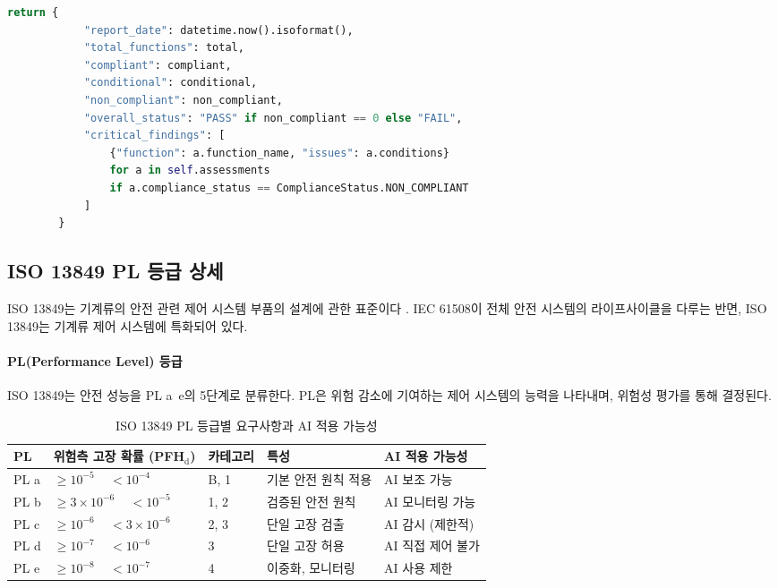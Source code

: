 \begin{lstlisting}[language=Python, caption={IEC 61508 AI Application Guide: SIL Compliance Assessment Framework}, label={lst:iec61508_guide}]
        return {
            "report_date": datetime.now().isoformat(),
            "total_functions": total,
            "compliant": compliant,
            "conditional": conditional,
            "non_compliant": non_compliant,
            "overall_status": "PASS" if non_compliant == 0 else "FAIL",
            "critical_findings": [
                {"function": a.function_name, "issues": a.conditions}
                for a in self.assessments
                if a.compliance_status == ComplianceStatus.NON_COMPLIANT
            ]
        }
\end{lstlisting}

\subsection{ISO 13849 PL 등급 상세}
\label{sec:19.2.2}

ISO 13849는 기계류의 안전 관련 제어 시스템 부품의 설계에 관한 표준이다 \cite{iso13849}. IEC 61508이 전체 안전 시스템의 라이프사이클을 다루는 반면, ISO 13849는 기계류 제어 시스템에 특화되어 있다.

\paragraph{PL(Performance Level) 등급}

ISO 13849는 안전 성능을 PL a~e의 5단계로 분류한다. PL은 위험 감소에 기여하는 제어 시스템의 능력을 나타내며, 위험성 평가를 통해 결정된다.

\begin{table}[htbp]
\centering
\caption{ISO 13849 PL 등급별 요구사항과 AI 적용 가능성}
\label{tab:19_pl}
\begin{tabularx}{\textwidth}{p{1cm}p{2.5cm}p{2cm}Xp{2.5cm}}
\toprule
\textbf{PL} & \textbf{위험측 고장 확률 (PFH$_\text{d}$)} & \textbf{카테고리} & \textbf{특성} & \textbf{AI 적용 가능성} \\
\midrule
PL a & $\geq 10^{-5}$ ~ $<10^{-4}$ & B, 1 & 기본 안전 원칙 적용 & AI 보조 가능 \\
PL b & $\geq 3 \times 10^{-6}$ ~ $<10^{-5}$ & 1, 2 & 검증된 안전 원칙 & AI 모니터링 가능 \\
PL c & $\geq 10^{-6}$ ~ $<3 \times 10^{-6}$ & 2, 3 & 단일 고장 검출 & AI 감시 (제한적) \\
PL d & $\geq 10^{-7}$ ~ $<10^{-6}$ & 3 & 단일 고장 허용 & AI 직접 제어 불가 \\
PL e & $\geq 10^{-8}$ ~ $<10^{-7}$ & 4 & 이중화, 모니터링 & AI 사용 제한 \\
\bottomrule
\end{tabularx}
\end{table}


